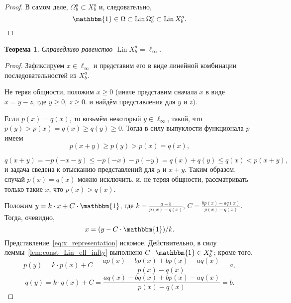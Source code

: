 \documentclass[a4paper,14pt]{article} %
\theoremstyle{plain}
\newtheorem{theorem}[lemma]{Теорема}
\begin{document}
\begin{proof}
	В самом деле,
	$\Omega^a_b \subset X^a_b$
	и, следовательно,
	\begin{equation}
		\mathbbm{1} \in \Omega \subset \operatorname{Lin} \Omega^a_b \subset \operatorname{Lin} X^a_b
		.
	\end{equation}
\end{proof}

\begin{theorem}
	\label{thm:Lin_ell_infty}
	Справедливо равенство $\operatorname{Lin} X^a_b = \ell_\infty$.
\end{theorem}

\begin{proof}
	Зафиксируем $x \in \ell_\infty$ и представим его в виде линейной комбинации последовательностей из $X^a_b$.

	Не теряя общности, положим $x\geq 0$
	(иначе представим сначала $x$ в виде $x = y - z$, где $y \geq 0$, $z \geq 0$.
	и найдём представления для $y$ и $z$).

	Если $p(x) = q(x)$, то возьмём некоторый $y\in\ell_\infty$,
	такой, что $p(y) > p(x) = q(x)  \geq q(y) \geq 0$.
	Тогда в силу выпуклости функционала $p$ имеем
	\begin{equation}
		p(x+y) \geq p(y) > p(x) = q(x)
		,
	\end{equation}


	\begin{equation}
		q(x+y) = -p(-x-y) \leq -p(-x) -p(-y) = q(x) + q(y) \leq q(x) < p(x+y)
		,
	\end{equation}
	и задача сведена к отысканию представлений для $y$ и $x+y$.
	Таким образом, случай $p(x) = q(x)$ можно исключить,
	и, не теряя общности, рассматривать только такие $x$, что $p(x) > q(x)$.

	Положим $y=k\cdot x + C\cdot\mathbbm{1}$,
	где $k=\frac{a-b}{p(x)-q(x)}$, $C=\frac{bp(x)-aq(x)}{p(x)-q(x)}$.
	Тогда, очевидно,
	\begin{equation}
		\label{eq:x_representation}
		x=(y-C\cdot\mathbbm{1})/k
		.
	\end{equation}
	Представление~\eqref{eq:x_representation} искомое.
	Действительно, в силу леммы~\ref{lem:const_Lin_ell_infty} выполнено
	$C\cdot\mathbbm{1}\in X^a_b$; кроме того,
	\begin{equation}
		p(y) = k\cdot p(x) + C
		=
		\frac{ap(x)-bp(x)+bp(x)-aq(x)}{p(x)-q(x)}
		=
		a
		,
	\end{equation}
	\begin{equation}
		q(y) = k\cdot q(x) + C
		=
		\frac{aq(x)-bq(x)+bp(x)-aq(x)}{p(x)-q(x)}
		=
		b
		.
	\end{equation}
\end{proof}
\end{document}
